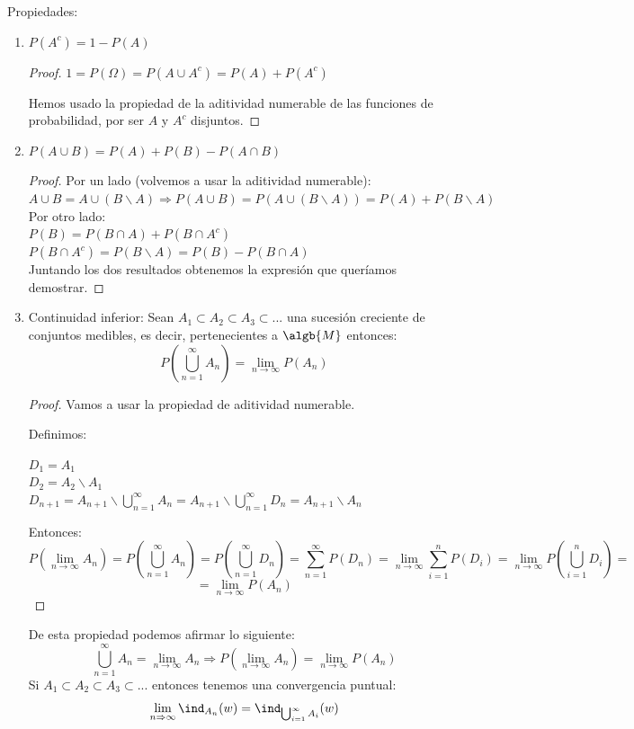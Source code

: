 \documentclass{apuntes}
\begin{document}
Propiedades:
\begin{enumerate}
\item $P(A^c) = 1-P(A)$
\begin{proof}
$1=P(\Omega)=P(A \cup A^c) = P(A) + P(A^c)$

Hemos usado la propiedad de la aditividad numerable de las funciones de probabilidad, por ser $A$ y $A^c$ disjuntos.
\end{proof}
\item $P(A \cup B) = P(A) + P(B) - P(A \cap B)$
\begin{proof}

Por un lado (volvemos a usar la aditividad numerable):\\
$A \cup B = A \cup (B \backslash A) \Rightarrow P(A \cup B) = P(A \cup (B \backslash A)) = P(A) + P(B \backslash A)$\\

Por otro lado:\\
$P(B) = P(B \cap A) + P(B \cap A^c)$\\
$P(B \cap A^c) = P(B \backslash A) = P(B) - P(B \cap A)$ \\

Juntando los dos resultados obtenemos la expresión que queríamos demostrar.
\end{proof}

\item Continuidad inferior: Sean $A_1 \subset A_2 \subset A_3 \subset ...$ una sucesión creciente de conjuntos medibles, es decir, pertenecientes a $\algb{M}$ entonces:
\[ P(\bigcup_{n=1}^{\infty}A_n) = \lim_{n \rightarrow \infty} P(A_n)
\]


\begin{proof}
Vamos a usar la propiedad de aditividad numerable.

Definimos:

$D_1=A_1$\\
$D_2=A_2 \backslash A_1$\\
$D_{n+1}=A_{n+1} \backslash \bigcup_{n=1}^{\infty}A_n=A_{n+1} \backslash \bigcup_{n=1}^{\infty}D_n=A_{n+1} \backslash A_n$

Entonces:
\[P(\lim_{n \rightarrow \infty}A_n)=P(\bigcup_{n=1}^{\infty}A_n)=P(\bigcup_{n=1}^{\infty}D_n)=\sum_{n=1}^{\infty}P(D_n)=\lim_{n \rightarrow \infty}\sum_{i=1}^{n}P(D_i)=\lim_{n \rightarrow \infty}P(\bigcup_{i=1}^{n}D_i) =
\]
\[
=\lim_{n \rightarrow \infty}P(A_n)
\]
\end{proof}

\obs De esta propiedad podemos afirmar lo siguiente: \[ \bigcup_{n=1}^{\infty}A_n = \lim_{n \rightarrow \infty} A_n \Rightarrow P(\lim_{n \rightarrow \infty} A_n) = \lim_{n \rightarrow \infty} P(A_n)
\]
\obs Si $A_1 \subset A_2 \subset A_3 \subset...$ entonces tenemos una convergencia puntual:
\[
\lim_{n \Rightarrow \infty}\ind_{A_n}(w) = \ind_{\bigcup_{i=1}^{\infty}A_i}(w)
\]


\end{enumerate}
\end{document}
